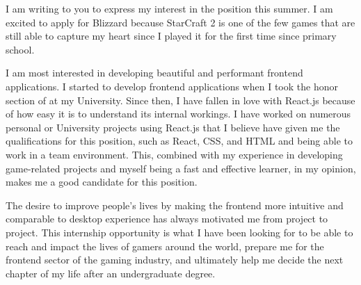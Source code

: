 I am writing to you to express my interest in the
 position this summer.
I am excited to apply for Blizzard because StarCraft 2 is one of
the few games that are still able to capture my heart since I played
it for the first time since primary school.

I am most interested in developing beautiful and performant frontend
applications. I started to develop frontend applications
when I took the honor section of  at my
University. Since then, I have fallen in love with React.js because of
how easy it is to understand its internal workings.
I have worked on numerous personal or University projects using React.js
that I believe have given me the qualifications for this position, such as
React, CSS, and HTML and being able to work in a team environment.
This, combined with my experience in developing game-related projects and
myself being a fast and effective learner,
in my opinion, makes me a good candidate for this position.

The desire to improve people's lives by making the frontend more
intuitive and comparable to desktop experience has always motivated
me from project to project.
This internship opportunity is what I have been looking for to
be able to reach and impact the lives of gamers around the world,
prepare me for the frontend sector of the gaming industry,
and ultimately help me decide the next chapter of my life after an
undergraduate degree.
